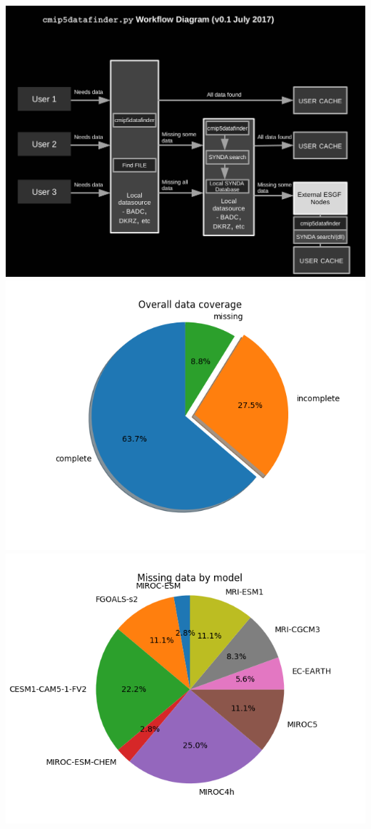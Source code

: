\documentclass[letterpaper,10pt,english]{sphinxmanual}
\begin{document}
\includegraphics[scale=1.0]{cmip5datafinder_flow}
\includegraphics[scale=0.5]{overall}
\includegraphics[scale=0.5]{missing}
\end{document}
